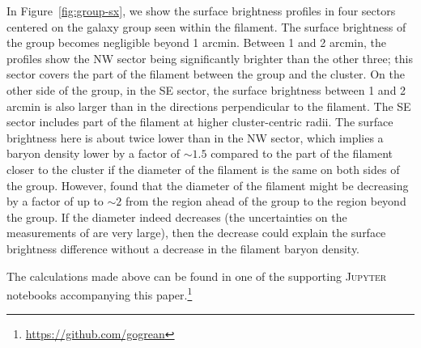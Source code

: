 In Figure~\ref{fig:group-sx}, we show the surface brightness profiles in four sectors centered on the galaxy group seen within the filament. The surface brightness of the group becomes negligible beyond 1 arcmin. Between 1 and 2 arcmin, the profiles show the NW sector being significantly brighter than the other three; this sector covers the part of the filament between the group and the cluster. On the other side of the group, in the SE sector, the surface brightness between 1 and 2 arcmin is also larger than in the directions perpendicular to the filament. The SE sector includes part of the filament at higher cluster-centric radii. The surface brightness here is about twice lower than in the NW sector, which implies a baryon density lower by a factor of $\sim 1.5$ compared to the part of the filament closer to the cluster if the diameter of the filament is the same on both sides of the group. However, \citet{Jauzac2012} found that the diameter of the filament might be decreasing by a factor of up to $\sim 2$ from the region ahead of the group to the region beyond the group. If the diameter indeed decreases (the uncertainties on the measurements of \citet{Jauzac2012} are very large), then the decrease could explain the surface brightness difference without a decrease in the filament baryon density.

The calculations made above can be found in one of the supporting \textsc{Jupyter} notebooks accompanying this paper.\footnote{\url{https://github.com/gogrean}}





